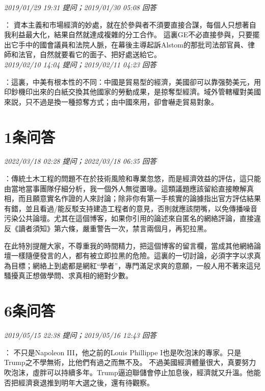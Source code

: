 \documentclass[twocolumn]{ctexart}
\begin{document}
\textit{\hfill\noindent\small 2019/01/29 19:31 提问；2019/01/30 05:08 回答}

：
資本主義和市場經濟的妙處，就在於參與者不須要直接合謀，每個人只想著自我利益最大化，結果自然就達成複雜的分工合作。
這裏GE不必直接參與，只要擺出它手中的國會議員和法院人脈，在幕後主導起訴Alstom的那批司法部官員、律師和法官，自然就要看它的面子、把好處送給它。
\\

\textit{\hfill\noindent\small 2019/02/10 14:04 提问；2019/02/11 04:23 回答}

：這裏，中美有根本性的不同：中國是貿易型的經濟，美國卻可以靠强勢美元，用印鈔機印出來的白紙交換其他國家的勞動成果，是掠奪型經濟。域外管轄權對美國來説，只不過是換一種掠奪方式；由中國來用，卻會嚇走貿易對象。
\\

\section{1条问答}

\textit{\hfill\noindent\small 2022/03/18 02:28 提问；2022/03/18 06:35 回答}

：傳統土木工程的問題不在於技術風險和專業忽悠，而是經濟效益的評估，這只能由當地當事團隊仔細分析，我一個外人無從置喙。這類議題應該留給直接瞭解真相，而且願意實名作證的人來討論；除非你有第一手核實的論據指出官方評估結果有錯，並且看過/能反駁支持建造工程者的意見，否則就應該閉嘴，以免傳播噪音污染公共論壇。尤其在這個博客，如果你引用的論述來自匿名的網絡評論，直接違反《讀者須知》第六條，嚴重警告一次，禁言兩個月，再犯拉黑。


在此特別提醒大家，不尊重我的時間精力，把這個博客的留言欄，當成其他網絡論壇一樣隨便發言的人，都有被立即拉黑的危險。這裏的一切討論，必須字字以求真為目標；網絡上到處都是網紅“學者”，專門滿足求爽的意願，一般人用不著來這兒騷擾真正想做學問、求真相的絕對少數。
\\

\section{6条问答}

\textit{\hfill\noindent\small 2019/05/15 22:38 提问；2019/05/16 12:43 回答}

：
不只是Napoleon III，他之前的Louis Phillippe I也是吹泡沫的專家。只是Trump之不學無術，比他們有過之而無不及。
不過美國經濟體量很大，真要努力吹泡沫，虛胖可以持續多年。Trump逼迫聯儲會停止加息後，經濟就又升溫。他能否把經濟衰退推到明年大選之後，還有待觀察。
\\
\end{document}
